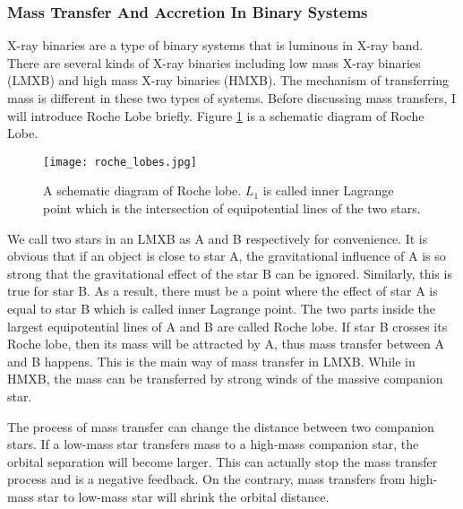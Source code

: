 \documentclass[12pt]{report}
\begin{document}
      \subsubsection{Mass Transfer And Accretion In Binary Systems}
        X-ray binaries are a type of binary systems that is luminous in X-ray band. 
        There are several kinds of X-ray binaries including low mass X-ray binaries 
        (LMXB) and high mass X-ray binaries (HMXB). The mechanism of transferring mass 
        is different in these two types of systems. Before discussing mass 
        transfers, I will introduce Roche Lobe briefly. Figure 
        \ref{fig:roche lobe} is a schematic diagram of Roche Lobe.
        \begin{figure}[!htp]
          \centering
          \texttt{[image: roche\_lobes.jpg]}
          \caption{A schematic diagram of Roche lobe. \protect $L_{1}$ is called inner 
                    Lagrange point which is the intersection of equipotential lines 
                    of the two stars.}
          \label{fig:roche lobe}
        \end{figure}
        We call two stars in an LMXB as A and B respectively for convenience. It is 
        obvious that if an object is close to star A, the gravitational influence of A 
        is so strong that the gravitational effect of the star B can be ignored. Similarly, 
        this is true for star B. As a result, there must be a point where the effect 
        of star A is equal to star B which is called inner Lagrange point.
        \citep{0004-637X-787-2-167} The two parts inside the largest
        equipotential lines of A and B are called Roche lobe. If star B crosses
        its Roche lobe, then its mass will be attracted by A, thus mass transfer between 
        A and B happens. This is the main way of mass transfer in 
        LMXB. While in HMXB, the mass can be transferred by strong winds of the massive 
        companion star. 

        The process of mass transfer can change the distance between two 
        companion stars. If a low-mass star transfers mass to a high-mass companion star,
        the orbital separation will become larger. This can actually stop the mass transfer
        process and is a negative feedback. On the contrary, mass transfers from high-mass 
        star to low-mass star will shrink the orbital distance.
                       
    
\end{document}
